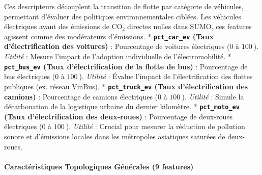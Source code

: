 \documentclass[11pt, a4paper]{article}
\begin{document}
Ces descripteurs découplent la transition de flotte par catégorie de
véhicules, permettant d'évaluer des politiques environnementales
ciblées. Les véhicules électriques ayant des émissions de CO₂ directes
nulles dans SUMO, ces features agissent comme des modérateurs
d'émissions. * \textbf{\texttt{pct\_car\_ev} (Taux d'électrification des
voitures)} : Pourcentage de voitures électriques (\(0\) à \(100\ %
\)). \emph{Utilité} : Mesure l'impact de l'adoption individuelle de
l'électromobilité. * \textbf{\texttt{pct\_bus\_ev} (Taux
d'électrification de la flotte de bus)} : Pourcentage de bus électriques
(\(0\) à \(100\ %
\)). \emph{Utilité} : Évalue l'impact de l'électrification des flottes
publiques (ex. réseau VinBus). * \textbf{\texttt{pct\_truck\_ev} (Taux
d'électrification des camions)} : Pourcentage de camions électriques
(\(0\) à \(100\ %
\)). \emph{Utilité} : Simule la décarbonation de la logistique urbaine
du dernier kilomètre. * \textbf{\texttt{pct\_moto\_ev} (Taux
d'électrification des deux-roues)} : Pourcentage de deux-roues
électriques (\(0\) à \(100\ %
\)). \emph{Utilité} : Crucial pour mesurer la réduction de pollution
sonore et d'émissions locales dans les métropoles asiatiques saturées de
deux-roues.

\paragraph{Caractéristiques Topologiques Générales (9
features)}\label{caractuxe9ristiques-topologiques-guxe9nuxe9rales-9-features}
\end{document}
